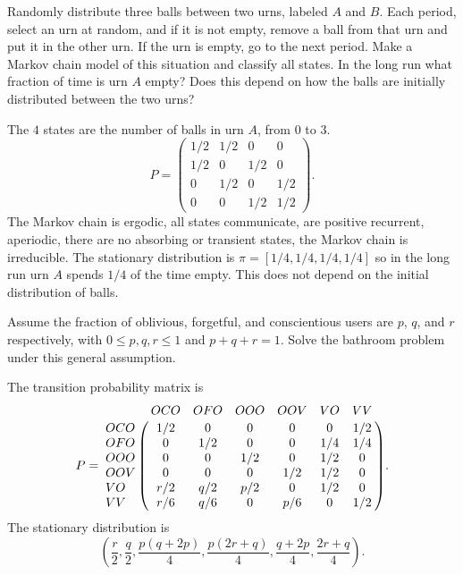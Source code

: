 \documentclass[12pt]{article}
\begin{document}
\begin{exercise}
    Randomly distribute three balls between two urns, labeled \( A \)
    and \( B \).  Each period, select an urn at random, and if it is not
    empty, remove a ball from that urn and put it in the other urn.  If
    the urn is empty, go to the next period.  Make a Markov chain model
    of this situation and classify all states.  In the long run what
    fraction of time is urn \( A \) empty?  Does this depend on how the
    balls are initially distributed between the two urns?
\end{exercise}
\begin{solution}
    The \( 4 \) states are the number of balls in urn \( A \), from \( 0
    \) to \( 3 \).
    \[
        P =
        \begin{pmatrix}
            1/2 & 1/2 & 0 & 0 \\
            1/2 & 0 & 1/2 & 0 \\
            0 & 1/2 & 0 & 1/2 \\
            0 & 0 & 1/2 & 1/2
        \end{pmatrix}
        .
    \] The Markov chain is ergodic, all states communicate, are positive
    recurrent, aperiodic, there are no absorbing or transient states,
    the Markov chain is irreducible.  The stationary distribution is \(
    \pi = [1/4, 1/4, 1/4, 1/4] \) so in the long run urn \( A \) spends \(
    1/4 \) of the time empty.  This does not depend on the initial
    distribution of balls.
\end{solution}

\begin{exercise}
    Assume the fraction of oblivious, forgetful, and conscientious users
    are \( p \), \( q \), and \( r \) respectively, with \( 0 \le p,q,r
    \le 1 \) and \( p + q + r = 1 \).  Solve the bathroom problem under
    this general assumption.
\end{exercise}
\begin{solution}
    The transition probability matrix is
    \[
        P= \bordermatrix{ & OCO & OFO & OOO & OOV & VO & VV \cr
        OCO & 1/2 & 0 & 0 & 0 & 0 & 1/2 \cr
        OFO & 0 & 1/2 & 0 & 0 & 1/4 & 1/4 \cr
        OOO & 0 & 0 & 1/2 & 0 & 1/2 & 0 \cr
        OOV & 0 & 0 & 0 & 1/2 & 1/2 & 0 \cr
        VO & r/2 & q/2 & p/2 & 0 & 1/2 & 0 \cr
        VV & r/6 & q/6 & 0 & p/6 & 0 & 1/2 \cr
        }.
    \] The stationary distribution is
    \[
        \left( \frac{r}{2}, \frac{q}{2}, \frac{p(q + 2p)}{4}, \frac{p(2r
        + q)}{4}, \frac{q + 2p}{4}, \frac{2r + q}{4} \right).
    \]
\end{solution}
\end{document}

